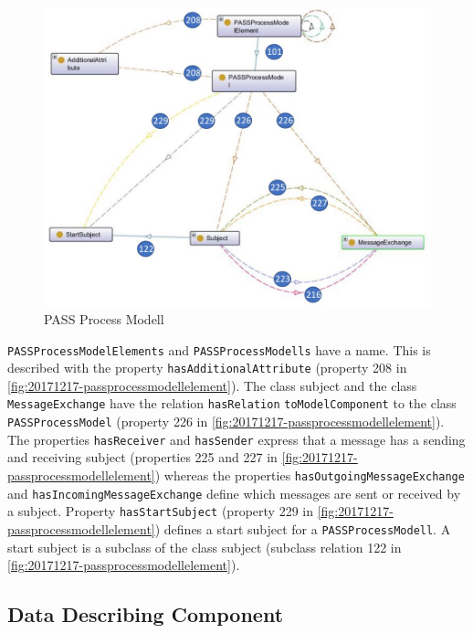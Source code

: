\begin{figure}[htbp]
	\centering
	\includegraphics[width=1.0\linewidth]{Figures/Ontology/SubjectInteraction/20181217-PASSProcessModel}
	\caption[PASS Process Modell]{PASS Process Modell}
	\label{fig:20181217-passprocessmodel}
\end{figure}

\texttt{PASSProcessModelElements} and \texttt{PASSProcessModells} have a name. This is described with the property \texttt{hasAdditionalAttribute} (property 208 in \ref{fig:20171217-passprocessmodellelement}). The class subject and the class \texttt{MessageExchange} have the relation \texttt{hasRelation} \texttt{toModelComponent} to the class \texttt{PASSProcessModel} (property 226 in \ref{fig:20171217-passprocessmodellelement}). The properties \texttt{hasReceiver} and \texttt{hasSender} express that a message has a sending and receiving subject (properties 225 and 227 in \ref{fig:20171217-passprocessmodellelement}) whereas the properties \texttt{hasOutgoingMessageExchange} and \texttt{hasIncomingMessageExchange} define which messages are sent or received by a subject. Property \texttt{hasStartSubject} (property 229 in \ref{fig:20171217-passprocessmodellelement}) defines a start subject for a \texttt{PASSProcessModell}. A start subject is a subclass of the class subject (subclass relation 122 in \ref{fig:20171217-passprocessmodellelement}).

\subsection{Data Describing Component}

